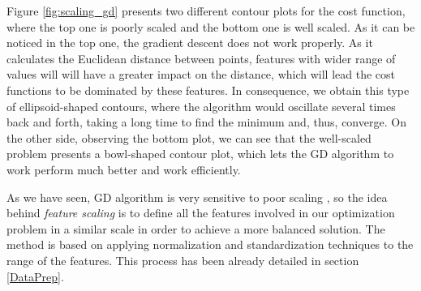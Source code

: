\documentclass[a4paper, report, oneside, UKenglish]{memoir}
\begin{document}
Figure \ref{fig:scaling_gd} presents two different contour plots for the cost function, where the top one is poorly scaled and the bottom one is well scaled. As it can be noticed in the top one, the gradient descent does not work properly. As it calculates the Euclidean distance between points, features with wider range of values will will have a greater impact on the distance, which will lead the cost functions to be dominated by these features. In consequence, we obtain this type of ellipsoid-shaped contours, where the algorithm would oscillate several times back and forth, taking a long time to find the minimum and, thus, converge. On the other side, observing the bottom plot, we can see that the well-scaled problem presents a bowl-shaped contour plot, which lets the GD algorithm to work perform much better and work efficiently.  

As we have seen, GD algorithm is very sensitive to poor scaling \cite{numericalopt}, so the idea behind \textit{feature scaling} is to define all the features involved in our optimization problem in a similar scale in order to achieve a more balanced solution. The method is based on applying normalization and standardization techniques to the range of the features. This process has been already detailed in section \ref{DataPrep}. 
















\end{document}
